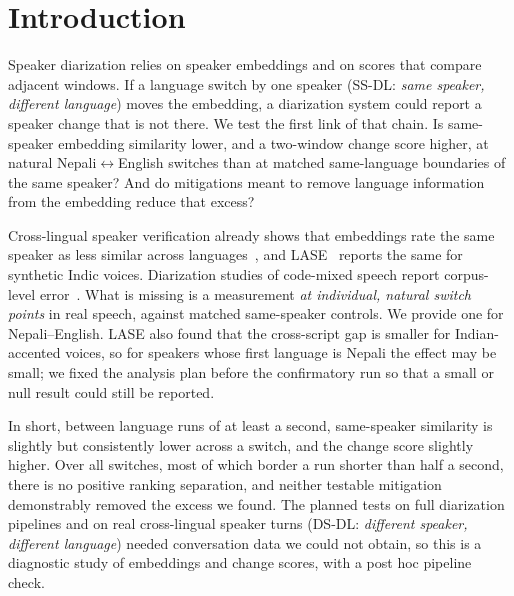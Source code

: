\documentclass[conference]{IEEEtran}
\begin{document}
\section{Introduction}
\label{sec:intro}
Speaker diarization relies on speaker embeddings and on scores that compare adjacent
windows. If a language switch by one speaker (SS-DL: \emph{same speaker, different
language}) moves the embedding, a diarization system could report a speaker change that is
not there. We test the first link of that chain. Is same-speaker embedding similarity lower,
and a two-window change score higher, at natural Nepali$\leftrightarrow$English switches
than at matched same-language boundaries of the same speaker? And do mitigations meant to remove language information from the embedding reduce that excess?

Cross-lingual speaker verification already shows that embeddings rate the same speaker as
less similar across languages~\cite{thienpondt2022,li2026}, and LASE~\cite{menta2026lase}
reports the same for synthetic Indic voices. Diarization studies of code-mixed speech report
corpus-level error~\cite{baghel2023displace}. What is missing is a measurement \emph{at
individual, natural switch points} in real speech, against matched same-speaker controls.
We provide one for Nepali--English. LASE also found that the cross-script gap is smaller for
Indian-accented voices, so for speakers whose first language is Nepali the effect may be
small; we fixed the analysis plan before the confirmatory run so that a small or null result could still be reported.

In short, between language runs of at least a second, same-speaker similarity is slightly
but consistently lower across a switch, and the change score slightly higher. Over all switches, most of which border a run shorter than half a second, there is no positive ranking separation, and neither testable mitigation demonstrably removed the excess we
found. The planned tests on full diarization pipelines and on real cross-lingual speaker
turns (DS-DL: \emph{different speaker, different language}) needed conversation data we
could not obtain, so this is a diagnostic study of embeddings and change scores, with a
post hoc pipeline check.
\end{document}
